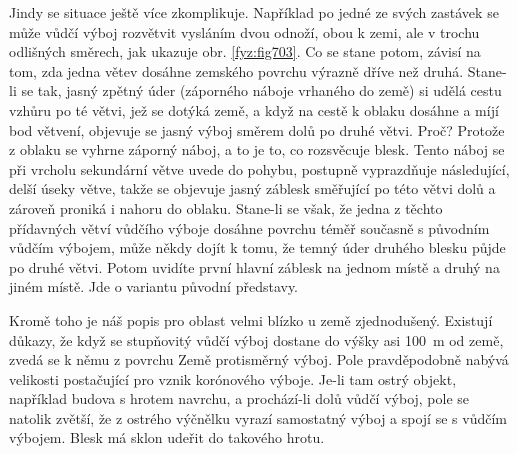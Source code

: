     Jindy se situace ještě více zkomplikuje. Například po jedné ze svých zastávek se může vůdčí
    výboj rozvětvit vysláním dvou odnoží, obou k zemi, ale v trochu odlišných směrech, jak ukazuje
    obr. \ref{fyz:fig703}. Co se stane potom, závisí na tom, zda jedna větev dosáhne zemského
    povrchu výrazně dříve než druhá. Stane-li se tak, jasný zpětný úder (záporného náboje vrhaného
    do země) si udělá cestu vzhůru po té větvi, jež se dotýká země, a když na cestě k oblaku dosáhne
    a míjí bod větvení, objevuje se jasný výboj směrem dolů po druhé větvi. Proč? Protože z oblaku
    se vyhrne záporný náboj, a to je to, co rozsvěcuje blesk. Tento náboj se při vrcholu sekundární
    větve uvede do pohybu, postupně vyprazdňuje následující, delší úseky větve, takže se objevuje
    jasný záblesk směřující po této větvi dolů a zároveň proniká i nahoru do oblaku. Stane-li se
    však, že jedna z těchto přídavných větví vůdčího výboje dosáhne povrchu téměř současně s
    původním vůdčím výbojem, může někdy dojít k tomu, že temný úder druhého blesku půjde po druhé
    větvi. Potom uvidíte první hlavní záblesk na jednom místě a druhý na jiném místě. Jde o variantu
    původní představy.

    Kromě toho je náš popis pro oblast velmi blízko u země zjednodušený. Existují důkazy, že když se
    stupňovitý vůdčí výboj dostane do výšky asi \SI{100}{\m} od země, zvedá se k němu z povrchu Země
    protisměrný výboj. Pole pravděpodobně nabývá velikosti postačující pro vznik korónového výboje.
    Je-li tam ostrý objekt, například budova s hrotem navrchu, a prochází-li dolů vůdčí výboj, pole
    se natolik zvětší, že z ostrého výčnělku vyrazí samostatný výboj a spojí se s vůdčím výbojem.
    Blesk má sklon udeřit do takového hrotu.